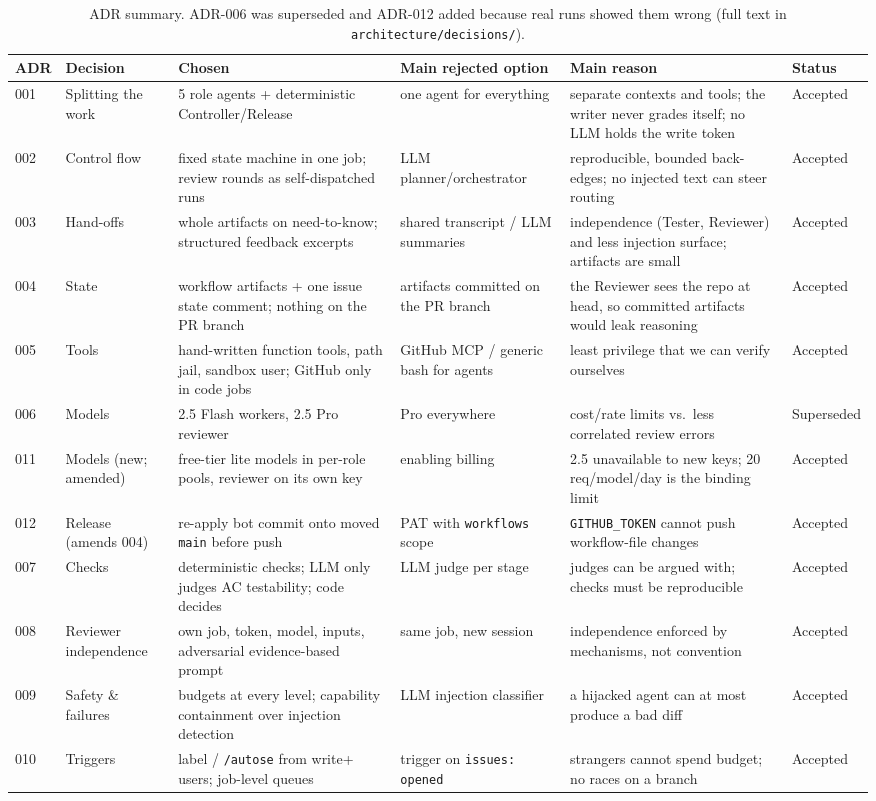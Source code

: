 \documentclass[10pt,a4paper]{article}
\newcommand{\code}[1]{\texttt{#1}}
\begin{document}
\begin{table}[H]\centering\scriptsize
\begin{tabularx}{\linewidth}{@{}l X X X X l@{}}
\toprule
ADR & Decision & Chosen & Main rejected option & Main reason & Status\\
\midrule
001 & Splitting the work & 5 role agents + deterministic Controller/Release & one agent for everything & separate contexts and tools; the writer never grades itself; no LLM holds the write token & Accepted\\
002 & Control flow & fixed state machine in one job; review rounds as self-dispatched runs & LLM planner/orchestrator & reproducible, bounded back-edges; no injected text can steer routing & Accepted\\
003 & Hand-offs & whole artifacts on need-to-know; structured feedback excerpts & shared transcript / LLM summaries & independence (Tester, Reviewer) and less injection surface; artifacts are small & Accepted\\
004 & State & workflow artifacts + one issue state comment; nothing on the PR branch & artifacts committed on the PR branch & the Reviewer sees the repo at head, so committed artifacts would leak reasoning & Accepted\\
005 & Tools & hand-written function tools, path jail, sandbox user; GitHub only in code jobs & GitHub MCP / generic bash for agents & least privilege that we can verify ourselves & Accepted\\
006 & Models & 2.5 Flash workers, 2.5 Pro reviewer & Pro everywhere & cost/rate limits vs.\ less correlated review errors & Superseded\\
011 & Models (new; amended) & free-tier lite models in per-role pools, reviewer on its own key & enabling billing & 2.5 unavailable to new keys; 20 req/model/day is the binding limit & Accepted\\
012 & Release (amends 004) & re-apply bot commit onto moved \code{main} before push & PAT with \code{workflows} scope & \code{GITHUB\_TOKEN} cannot push workflow-file changes & Accepted\\
007 & Checks & deterministic checks; LLM only judges AC testability; code decides & LLM judge per stage & judges can be argued with; checks must be reproducible & Accepted\\
008 & Reviewer independence & own job, token, model, inputs, adversarial evidence-based prompt & same job, new session & independence enforced by mechanisms, not convention & Accepted\\
009 & Safety \& failures & budgets at every level; capability containment over injection detection & LLM injection classifier & a hijacked agent can at most produce a bad diff & Accepted\\
010 & Triggers & label / \code{/autose} from write+ users; job-level queues & trigger on \code{issues: opened} & strangers cannot spend budget; no races on a branch & Accepted\\
\bottomrule
\end{tabularx}
\caption{ADR summary. ADR-006 was superseded and ADR-012 added because real runs showed them wrong (full text in \code{architecture/decisions/}).}
\end{table}
\end{document}
